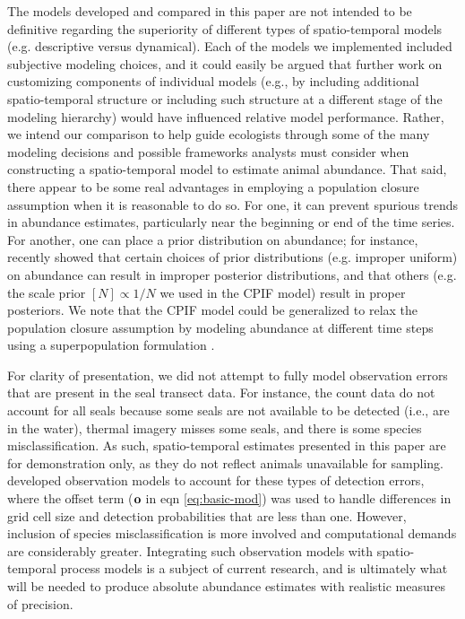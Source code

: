 \documentclass[times,mee,doublespace,]{besauth2}
\begin{document}
The models developed and compared in this paper are not intended to be definitive regarding the superiority
of different types of spatio-temporal models (e.g. descriptive versus dynamical).  Each of the models we implemented included subjective modeling choices, and it could easily be argued that further work on customizing components of individual models (e.g., by including additional spatio-temporal structure or including such structure at a different stage of the modeling hierarchy) would have influenced relative model performance.  Rather, we intend our comparison to help guide ecologists through some of the many modeling decisions and possible frameworks analysts must consider when constructing a spatio-temporal model to estimate animal abundance.  That said, there appear to be some real advantages in employing a population closure assumption when it is reasonable to do so.  For one, it can prevent spurious trends in abundance estimates, particularly near the beginning or end of the time series.  For another, one can place a prior distribution on abundance; for instance, \citet{Link2013} recently showed that certain choices of prior distributions (e.g. improper uniform) on abundance can result in improper posterior distributions, and that others (e.g. the scale prior $[N] \propto 1/N$ we used in the CPIF model) result in proper posteriors.  We note that the CPIF model could be generalized to relax the population closure assumption by modeling abundance at different time steps using a superpopulation formulation \citep[as with the Schwarz-Arnason parameterization of the Jolly-Seber model; cf.][]{SchwarzArnason1996}.

For clarity of presentation, we did not attempt to fully model observation errors that are present in the seal transect data.  For instance, the count data do not account for all seals because some seals are not available to be detected (i.e., are in the water), thermal imagery misses some seals, and there is some species misclassification. As such, spatio-temporal estimates presented in this paper are for demonstration only, as they do not reflect animals unavailable for sampling. \citet{ConnEtAl2014} developed observation models to account for these types of detection errors, where the offset term (${\bf o}$ in eqn \ref{eq:basic-mod}) was used to handle differences in grid cell size and detection probabilities that are less than one.  However, inclusion of species misclassification is more involved and computational demands are considerably greater.  Integrating such observation models with spatio-temporal process models is a subject of current research, and is ultimately what will be needed to produce absolute abundance estimates with realistic measures of precision.
\end{document}
